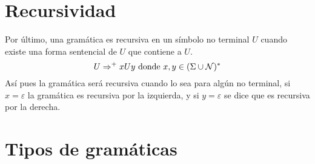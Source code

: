 \section{Recursividad}

Por último, una gramática es recursiva en un símbolo no terminal $U$ cuando existe una forma sentencial de $U$ que contiene a $U$. \[U \Rightarrow^{+}xUy \textup{ donde } x,y\in (\Sigma \cup \mathcal{N})^{*} \]
Así pues la gramática será recursiva cuando lo sea para algún no terminal, si $x = \varepsilon$ la gramática es recursiva por la izquierda, y si $y = \varepsilon$ se dice que es recursiva por la derecha.

\section{Tipos de gramáticas }

